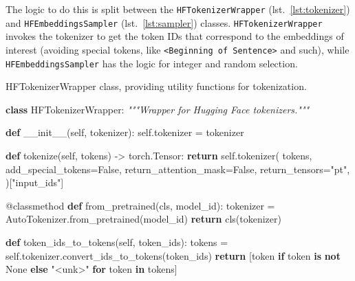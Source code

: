 \documentclass[
  a4paper, twoside, 10pt, titlepage]{book}
\newenvironment{Shaded}{}{}
\newcommand{\AttributeTok}[1]{\textcolor[rgb]{0.49,0.56,0.16}{#1}}
\newcommand{\CommentTok}[1]{\textcolor[rgb]{0.38,0.63,0.69}{\textit{#1}}}
\newcommand{\ControlFlowTok}[1]{\textcolor[rgb]{0.00,0.44,0.13}{\textbf{#1}}}
\newcommand{\FunctionTok}[1]{\textcolor[rgb]{0.02,0.16,0.49}{#1}}
\newcommand{\KeywordTok}[1]{\textcolor[rgb]{0.00,0.44,0.13}{\textbf{#1}}}
\newcommand{\NormalTok}[1]{#1}
\newcommand{\OperatorTok}[1]{\textcolor[rgb]{0.40,0.40,0.40}{#1}}
\newcommand{\StringTok}[1]{\textcolor[rgb]{0.25,0.44,0.63}{#1}}
\newcommand{\VariableTok}[1]{\textcolor[rgb]{0.10,0.09,0.49}{#1}}
\begin{document}
The logic to do this is split between the \texttt{HFTokenizerWrapper}
(lst.~\ref{lst:tokenizer}) and \texttt{HFEmbeddingsSampler}
(lst.~\ref{lst:sampler}) classes. \texttt{HFTokenizerWrapper} invokes
the tokenizer to get the token IDs that correspond to the embeddings of
interest (avoiding special tokens, like
\texttt{\textless{}Beginning\ of\ Sentence\textgreater{}} and such),
while \texttt{HFEmbeddingsSampler} has the logic for integer and random
selection.

\begin{codelisting}

\caption{HFTokenizerWrapper class, providing utility functions for
tokenization.}\label{lst:tokenizer}

\begin{Shaded}
\begin{Highlighting}[]
\KeywordTok{class}\NormalTok{ HFTokenizerWrapper:}
    \CommentTok{"""Wrapper for Hugging Face tokenizers."""}

    \KeywordTok{def} \FunctionTok{\_\_init\_\_}\NormalTok{(}\VariableTok{self}\NormalTok{, tokenizer):}
        \VariableTok{self}\NormalTok{.tokenizer }\OperatorTok{=}\NormalTok{ tokenizer}

    \KeywordTok{def}\NormalTok{ tokenize(}\VariableTok{self}\NormalTok{, tokens) }\OperatorTok{{-}\textgreater{}}\NormalTok{ torch.Tensor:}
        \ControlFlowTok{return} \VariableTok{self}\NormalTok{.tokenizer(}
\NormalTok{            tokens,}
\NormalTok{            add\_special\_tokens}\OperatorTok{=}\VariableTok{False}\NormalTok{,}
\NormalTok{            return\_attention\_mask}\OperatorTok{=}\VariableTok{False}\NormalTok{,}
\NormalTok{            return\_tensors}\OperatorTok{=}\StringTok{"pt"}\NormalTok{,}
\NormalTok{        )[}\StringTok{"input\_ids"}\NormalTok{]}

    \AttributeTok{@classmethod}
    \KeywordTok{def}\NormalTok{ from\_pretrained(cls, model\_id):}
\NormalTok{        tokenizer }\OperatorTok{=}\NormalTok{ AutoTokenizer.from\_pretrained(model\_id)}
        \ControlFlowTok{return}\NormalTok{ cls(tokenizer)}

    \KeywordTok{def}\NormalTok{ token\_ids\_to\_tokens(}\VariableTok{self}\NormalTok{, token\_ids):}
\NormalTok{        tokens }\OperatorTok{=} \VariableTok{self}\NormalTok{.tokenizer.convert\_ids\_to\_tokens(token\_ids)}
        \ControlFlowTok{return}\NormalTok{ [token }\ControlFlowTok{if}\NormalTok{ token }\KeywordTok{is} \KeywordTok{not} \VariableTok{None} \ControlFlowTok{else} \StringTok{"\textless{}unk\textgreater{}"} \ControlFlowTok{for}\NormalTok{ token }\KeywordTok{in}\NormalTok{ tokens]}
\end{Highlighting}
\end{Shaded}

\end{codelisting}
\end{document}
